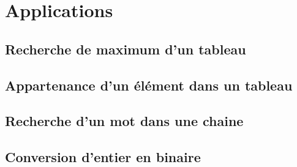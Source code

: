 \section{Applications}
\subsection{Recherche de maximum d'un tableau}
\setcounter{thequestion}{0}

\subsection{Appartenance d'un élément dans un tableau}
\setcounter{thequestion}{0}

\subsection{Recherche d'un mot dans une chaine}
\setcounter{thequestion}{0}

\subsection{Conversion d'entier en binaire}
\setcounter{thequestion}{0}

